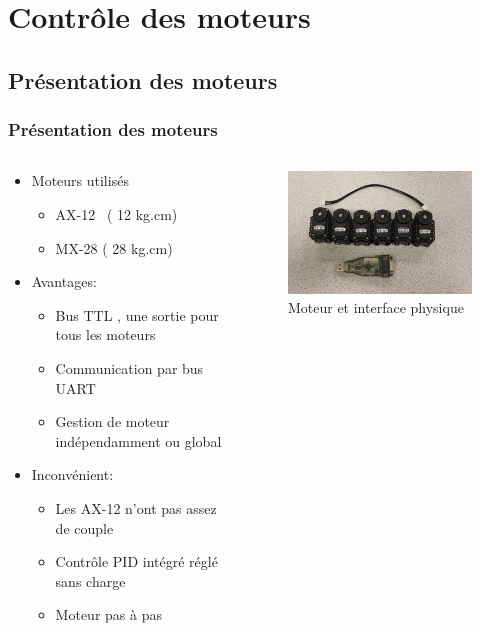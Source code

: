 \section{Contrôle des moteurs}
\subsection{Présentation des moteurs}
\begin{frame}
  \frametitle{Présentation des moteurs}
  \begin{columns}[T]
    \begin{column}{.65\textwidth}
           \begin{itemize}
            \item Moteurs utilisés 
            \begin{itemize}
              \item AX-12~ ( 12 kg.cm)
              \item MX-28 ( 28 kg.cm)
            \end{itemize}
            \item Avantages:
            \begin{itemize}
              \item Bus TTL , une sortie pour tous les moteurs
              \item Communication par bus UART
              \item Gestion de moteur indépendamment ou global
            \end{itemize}
          \item Inconvénient:
            \begin{itemize}
              \item Les AX-12 n'ont pas assez de couple
              \item Contrôle PID intégré réglé sans charge
              \item Moteur pas à pas
            \end{itemize}
          \end{itemize}
        \end{column}
        \begin{column}{.3\textwidth}
          \begin{figure}[ht]
            \centering
            \includegraphics[scale= 0.35]{../img/AX12+USB_2_DynamicCell.JPG}
            \caption{Moteur et interface physique}
          \end{figure}
        \end{column}
      \end{columns}

\end{frame}
